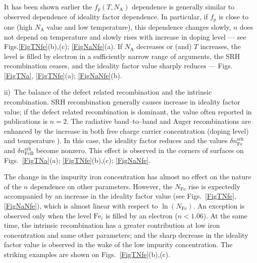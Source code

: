 \documentclass[12pt]{article}
\begin{document}
It has been shown earlier \cite{Olikh2018SM}  the $f_p(T,N_\mathrm{A})$ dependence is generally similar to observed dependence of ideality factor dependence.
In particular, if $f_p$ is close to one (high $N_\mathrm{A}$ value and low temperature), this dependence changes slowly,
$n$ does not depend on temperature and slowly rises with increase in doping level --- see Figs.\ref{FigTNfe}(b),(c); \ref{FigNaNfe}(a).
If $N_\mathrm{A}$ decreases or (and) $T$ increases,
the level is filled by electron in a sufficiently narrow range of arguments,
the SRH recombination ceases,
and the ideality factor value sharply  reduces --- Figs.\ref{FigTNa}, \ref{FigTNfe}(a); \ref{FigNaNfe}(b).

ii)~The balance of the defect related recombination and the intrinsic recombination.
SRH recombination generally causes increase in ideality factor value;
if the defect related recombination is dominant, the value often reported in publications is $n=2$.
The radiative band--to--band and Auger recombinations are enhanced by the increase in both free charge carrier concentration
(doping level) and temperature   \cite{Si_BtB,Si_Auger}).
In this case, the ideality factor reduces and the values $\delta n_\mathrm{Fe}^\mathrm{srh}$
and $\delta n_\mathrm{FeB}^\mathrm{srh}$ become nonzero.
This effect is observed in the corners of surfaces on Figs.~\ref{FigTNa}(a); \ref{FigTNfe}(b),(c); \ref{FigNaNfe}.


The change in the impurity iron concentration has almost no effect on the nature of the $n$ dependence on other parameters.
However, the $N_\mathrm{Fe}$ rise is expectedly accompanied by an increase in the ideality factor value (see Figs.~\ref{FigTNfe}, \ref{FigNaNfe}),
which is almost linear with respect to $\ln(N_\mathrm{Fe})$.
An exception is observed only when the level $\mathrm{Fe}_i$  is filled by an electron ($n<1.06$).
At the same time,
the intrinsic recombination has a greater contribution at low iron concentration and same other parameters;
and the sharp decrease in the ideality factor value is observed in the wake of the low impurity concentration.
The striking examples are shown on Figs.~\ref{FigTNfe}(b),(c).
\end{document}
